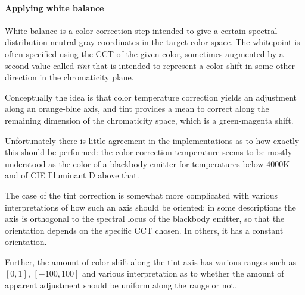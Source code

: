 %   

\paragraph{Applying white balance}
White balance is a color correction step intended to give a certain spectral distribution 
 neutral gray coordinates in the target color space.
The whitepoint is often specified using the \gls{CCT} of the given color,
sometimes augmented by a second value called \textsl{tint} that is intended to represent a color shift 
in some other direction in the chromaticity plane. 
    
    Conceptually the idea is that
color temperature correction yields an adjustment along an orange-blue axis, and tint provides
a mean to correct along the remaining dimension of the chromaticity space, which is a green-magenta shift.

Unfortunately there is little agreement in the implementations as to how exactly this should be performed:
the color correction temperature seems to be mostly understood as the color of a blackbody emitter for
temperatures below $4000\si{\kelvin}$ and of \gls{CIE} Illuminant D above that. 

The case of the tint correction is somewhat more complicated with various interpretations 
of how such an axis should be oriented: in some descriptions the axis is orthogonal to the 
spectral locus of the blackbody emitter, so that the orientation depends on the specific 
\gls{CCT} chosen. In others, it has a constant orientation. 

Further, the amount of color shift along the tint axis has various ranges such as $[0,1]$, 
$[-100,100]$ and various interpretation as to whether the amount of apparent adjustment should be 
uniform along the range or not.

